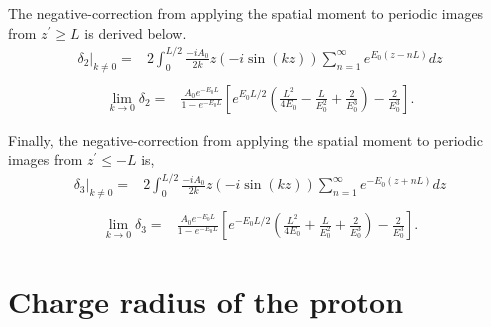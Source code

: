 \documentclass[prd,aps,twocolumn,superscriptaddress,tightenlines,nofootinbib,floatfix,preprintnumbers,10pt]{revtex4-1}
\begin{document}
The negative-correction from applying the spatial moment to periodic images from $z^\prime \geq L$ is derived below. 
\begin{align}
\left.\delta_{2}\right|_{k\neq 0} =& 2\int_0^{L/2} \frac{-iA_0}{2k}z(-i\sin(kz)) \sum_{n=1}^\infty e^{E_0(z-nL)} dz \label{eq:dfv_2.1}\\
\end{align}
\begin{align}
\lim_{k\rightarrow 0}\delta_2= & \frac{A_0e^{-E_0L}}{1-e^{-E_0L}}\left[ e^{E_0L/2}\left(\frac{L^2}{4E_0}-\frac{L}{E_0^2}+\frac{2}{E_0^3}\right)-\frac{2}{E_0^3}\right].
\label{eq:dfv_2.2}
\end{align}

Finally, the negative-correction from applying the spatial moment to periodic images from $z^\prime \leq -L$ is,
\begin{align}
\left.\delta_{3}\right|_{k\neq 0}= & 2\int_{0}^{L/2}  \frac{-iA_0}{2k}z(-i\sin(kz)) \sum_{n=1}^\infty e^{-E_0(z+nL)} dz \label{eq:dfv_3.1}\\
\end{align}
\begin{align}
\lim_{k\rightarrow 0} \delta_3= & \frac{A_0e^{-E_0L}}{1-e^{-E_0L}}\left[ e^{-E_0L/2}\left(\frac{L^2}{4E_0}+\frac{L}{E_0^2}+\frac{2}{E_0^3}\right)-\frac{2}{E_0^3}\right].
\label{eq:dfv_3.0}
\end{align}

\section{Charge radius of the proton}\label{sec:results}
\end{document}

